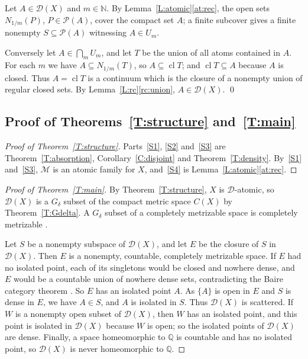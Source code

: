 \documentclass[11pt,reqno]{amsart}
\theoremstyle{plain}
\theoremstyle{definition}
\theoremstyle{remark}
\newcommand{\D}{\mathcal{D}}
\newcommand{\M}{\mathcal{M}}
\newcommand{\PP}{\mathcal{P}}
\newcommand{\cl}{\operatorname{cl}}
\newcommand{\N}{\mathbb{N}}
\newcommand{\Q}{\mathbb{Q}}
\begin{document}
Let $A\in\D(X)$ and $m\in\N$. By Lemma~\ref{L:atomic}\ref{at:rec}, the open sets $N_{1/m}(P)$, $P\in\PP(A)$, cover the compact set $A$; a finite subcover gives a finite nonempty $S\subseteq\PP(A)$ witnessing $A\in U_m$.

Conversely let $A\in\bigcap_mU_m$, and let $T$ be the union of all atoms contained in $A$. For each $m$ we have $A\subseteq N_{1/m}(T)$, so $A\subseteq\cl T$; and $\cl T\subseteq A$ because $A$ is closed. Thus $A=\cl T$ is a continuum which is the closure of a nonempty union of regular closed sets. By Lemma~\ref{L:rc}\ref{rc:union}, $A\in\D(X)$. \qed

\subsection{Proof of Theorems~\ref{T:structure} and~\ref{T:main}}

\begin{proof}[Proof of Theorem~\ref{T:structure}]
Parts~\ref{S1}, \ref{S2} and~\ref{S3} are Theorem~\ref{T:absorption}, Corollary~\ref{C:disjoint} and Theorem~\ref{T:density}. By~\ref{S1} and~\ref{S3}, $\M$ is an atomic family for $X$, and~\ref{S4} is Lemma~\ref{L:atomic}\ref{at:rec}.
\end{proof}

\begin{proof}[Proof of Theorem~\ref{T:main}]
By Theorem~\ref{T:structure}, $X$ is $\D$-atomic, so $\D(X)$ is a $G_\delta$ subset of the compact metric space $C(X)$ by Theorem~\ref{T:Gdelta}. A $G_\delta$ subset of a completely metrizable space is completely metrizable \cite[Theorem~3.11]{Kechris}.

Let $S$ be a nonempty subspace of $\D(X)$, and let $E$ be the closure of $S$ in $\D(X)$. Then $E$ is a nonempty, countable, completely metrizable space. If $E$ had no isolated point, each of its singletons would be closed and nowhere dense, and $E$ would be a countable union of nowhere dense sets, contradicting the Baire category theorem \cite[Theorem~8.4]{Kechris}. So $E$ has an isolated point $A$. As $\{A\}$ is open in $E$ and $S$ is dense in $E$, we have $A\in S$, and $A$ is isolated in $S$. Thus $\D(X)$ is scattered. If $W$ is a nonempty open subset of $\D(X)$, then $W$ has an isolated point, and this point is isolated in $\D(X)$ because $W$ is open; so the isolated points of $\D(X)$ are dense. Finally, a space homeomorphic to $\Q$ is countable and has no isolated point, so $\D(X)$ is never homeomorphic to $\Q$.
\end{proof}
\end{document}
